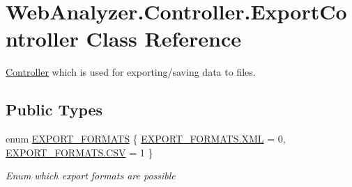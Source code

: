 \hypertarget{class_web_analyzer_1_1_controller_1_1_export_controller}{}\section{Web\+Analyzer.\+Controller.\+Export\+Controller Class Reference}
\label{class_web_analyzer_1_1_controller_1_1_export_controller}


\hyperlink{namespace_web_analyzer_1_1_controller}{Controller} which is used for exporting/saving data to files.  


\subsection*{Public Types}
\begin{DoxyCompactItemize}
\item 
enum \hyperlink{class_web_analyzer_1_1_controller_1_1_export_controller_a8cea4a311ecaf495f305f9d7829a57aa}{E\+X\+P\+O\+R\+T\+\_\+\+F\+O\+R\+M\+A\+T\+S} \{ \hyperlink{class_web_analyzer_1_1_controller_1_1_export_controller_a8cea4a311ecaf495f305f9d7829a57aaa3501bb093d363810b671059b9cfed3f8}{E\+X\+P\+O\+R\+T\+\_\+\+F\+O\+R\+M\+A\+T\+S.\+X\+M\+L} = 0, 
\hyperlink{class_web_analyzer_1_1_controller_1_1_export_controller_a8cea4a311ecaf495f305f9d7829a57aaacc8d68c551c4a9a6d5313e07de4deafd}{E\+X\+P\+O\+R\+T\+\_\+\+F\+O\+R\+M\+A\+T\+S.\+C\+S\+V} = 1
 \}\begin{DoxyCompactList}\small\item\em Enum which export formats are possible \end{DoxyCompactList}
\end{DoxyCompactItemize}
